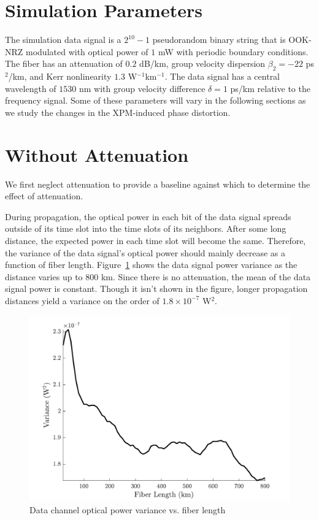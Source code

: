 \section{Simulation Parameters}

The simulation data signal is a $2^{10}-1$ pseudorandom binary string \cite{PRBS} that is OOK-NRZ modulated with optical power of $1$ mW with periodic boundary conditions. The fiber has an attenuation of $0.2$ dB/km, group velocity dispersion $\beta_2 = -22$ ps$^2$/km, and Kerr nonlinearity $1.3$ W$^{-1}$km$^{-1}$. The data signal has a central wavelength of $1530$ nm with group velocity difference $\delta = 1$ ps/km relative to the frequency signal. Some of these parameters will vary in the following sections as we study the changes in the XPM-induced phase distortion.


\section{Without Attenuation}

We first neglect attenuation to provide a baseline against which to determine the effect of attenuation.

During propagation, the optical power in each bit of the data signal spreads outside of its time slot into the time slots of its neighbors. After some long distance, the expected power in each time slot will become the same. Therefore, the variance of the data signal's optical power should mainly decrease as a function of fiber length. Figure~\ref{fig:NACalcVar} shows the data signal power variance as the distance varies up to $800$ km. Since there is no attenuation, the mean of the data signal power is constant. Though it isn't shown in the figure, longer propagation distances yield a variance on the order of $1.8 \times 10^{-7}$ W$^2$.
%
\begin{figure}[htb]
	\centering
	\includegraphics[scale=0.9]{img/NACalcVar}
	\caption{Data channel optical power variance vs. fiber length} \label{fig:NACalcVar}
\end{figure}
%


